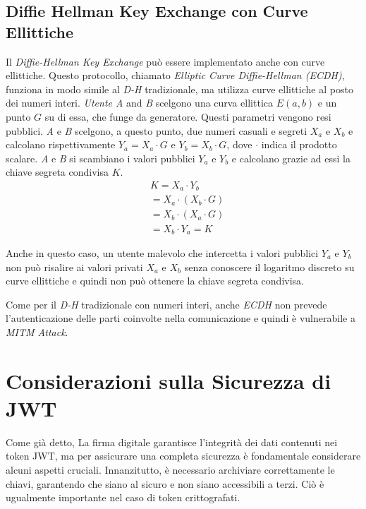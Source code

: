 \subsection{Diffie Hellman Key Exchange con Curve Ellittiche}
\label{sec:ecdh}

Il \emph{Diffie-Hellman Key Exchange} può essere implementato anche con curve ellittiche. Questo protocollo, chiamato \emph{Elliptic Curve Diffie-Hellman (ECDH)}, funziona in modo simile al \emph{D-H} tradizionale, ma utilizza curve ellittiche al posto dei numeri interi.
\emph{Utente A} and \emph{B} scelgono una curva ellittica $E(a,b)$ e un punto $G$ su di essa, che funge da generatore. Questi parametri vengono resi pubblici.
\emph{A} e \emph{B} scelgono, a questo punto, due numeri casuali e segreti $X_a$ e $X_b$ e calcolano rispettivamente $Y_a = X_a \cdot G$ e $Y_b = X_b \cdot G$, dove $\cdot$ indica il prodotto scalare.
\emph{A} e \emph{B} si scambiano i valori pubblici $Y_a$ e $Y_b$ e calcolano grazie ad essi la chiave segreta condivisa $K$.
\begin{equation}
	\begin{aligned}
		&K = X_a \cdot Y_b\\
		&= X_a \cdot (X_b \cdot G)\\
		&= X_b \cdot (X_a \cdot G)\\
		&= X_b \cdot Y_a = K
	\end{aligned}
\end{equation}

Anche in questo caso, un utente malevolo che intercetta i valori pubblici $Y_a$ e $Y_b$ non può risalire ai valori privati $X_a$ e $X_b$ senza conoscere il logaritmo discreto su curve ellittiche e quindi non può ottenere la chiave segreta condivisa.

Come per il \emph{D-H} tradizionale con numeri interi, anche \emph{ECDH} non prevede l'autenticazione delle parti coinvolte nella comunicazione e quindi è vulnerabile a \emph{MITM Attack}.


\section{Considerazioni sulla Sicurezza di JWT}
Come già detto, La firma digitale garantisce l'integrità dei dati contenuti nei token JWT, ma per assicurare una completa sicurezza è fondamentale considerare alcuni aspetti cruciali.
Innanzitutto, è necessario archiviare correttamente le chiavi, garantendo che siano al sicuro e non siano accessibili a terzi.
Ciò è ugualmente importante nel caso di token crittografati.

